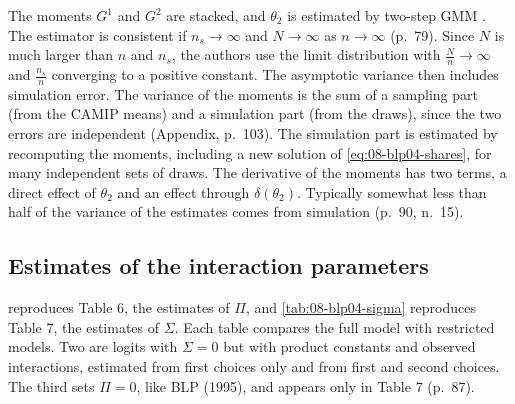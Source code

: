  The moments $G^1$ and $G^2$ are stacked, and $\theta_2$ is estimated by two-step GMM
\citep{Hansen1982}. The estimator is consistent if $n_s \to \infty$ and $N \to \infty$ as $n \to \infty$
(p.~79). Since $N$ is much larger than $n$ and $n_s$, the authors use the limit distribution with
$\frac{N}{n} \to \infty$ and $\frac{n_s}{n}$ converging to a positive constant. The asymptotic variance then
includes simulation error. The variance of the moments is the sum of a sampling part (from the CAMIP means) and
a simulation part (from the draws), since the two errors are independent (Appendix, p.~103). The simulation
part is estimated by recomputing the moments, including a new solution of \eqref{eq:08-blp04-shares}, for many
independent sets of draws. The derivative of the moments has two terms, a direct effect of $\theta_2$ and an
effect through $\delta(\theta_2)$. Typically somewhat less than half of the variance of the estimates comes from
simulation (p.~90, n.~15).

\subsection{Estimates of the interaction parameters}\label{sec:08-blp04-estimates}

 reproduces Table 6, the estimates of $\Pi$, and \cref{tab:08-blp04-sigma} reproduces
Table 7, the estimates of $\Sigma$. Each table compares the full model with restricted models. Two are logits
with $\Sigma = 0$ but with product constants and observed interactions, estimated from first choices only and
from first and second choices. The third sets $\Pi = 0$, like BLP (1995), and appears only in Table 7
(p.~87).

